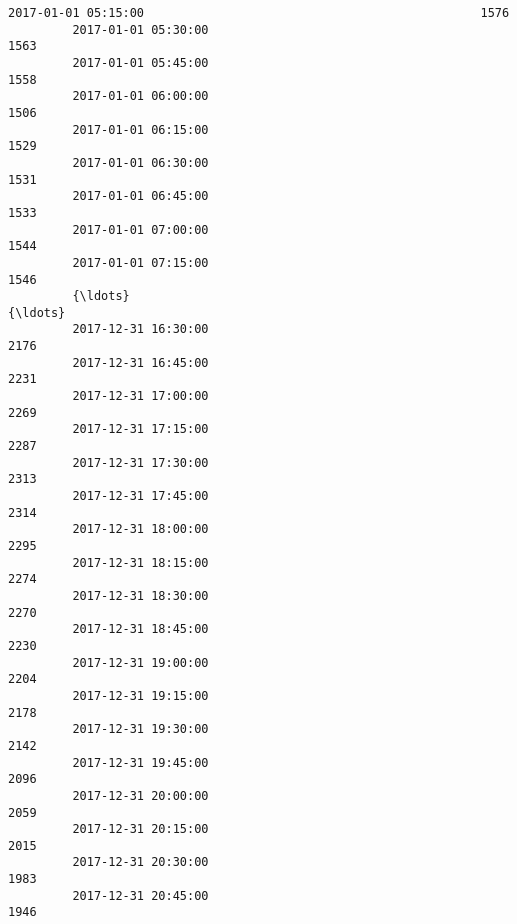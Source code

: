 \documentclass[11pt]{article}
\begin{document}
\begin{Verbatim}[commandchars=\\\{\}]
         2017-01-01 05:15:00                                               1576               
         2017-01-01 05:30:00                                               1563               
         2017-01-01 05:45:00                                               1558               
         2017-01-01 06:00:00                                               1506               
         2017-01-01 06:15:00                                               1529               
         2017-01-01 06:30:00                                               1531               
         2017-01-01 06:45:00                                               1533               
         2017-01-01 07:00:00                                               1544               
         2017-01-01 07:15:00                                               1546               
         {\ldots}                                                                {\ldots}               
         2017-12-31 16:30:00                                               2176               
         2017-12-31 16:45:00                                               2231               
         2017-12-31 17:00:00                                               2269               
         2017-12-31 17:15:00                                               2287               
         2017-12-31 17:30:00                                               2313               
         2017-12-31 17:45:00                                               2314               
         2017-12-31 18:00:00                                               2295               
         2017-12-31 18:15:00                                               2274               
         2017-12-31 18:30:00                                               2270               
         2017-12-31 18:45:00                                               2230               
         2017-12-31 19:00:00                                               2204               
         2017-12-31 19:15:00                                               2178               
         2017-12-31 19:30:00                                               2142               
         2017-12-31 19:45:00                                               2096               
         2017-12-31 20:00:00                                               2059               
         2017-12-31 20:15:00                                               2015               
         2017-12-31 20:30:00                                               1983               
         2017-12-31 20:45:00                                               1946               

\end{Verbatim}
\end{document}
